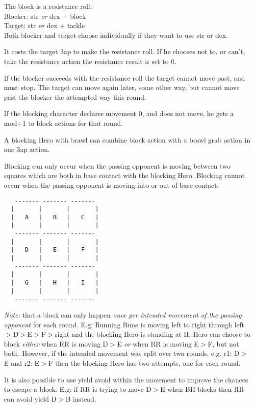 The block is a resistance roll: \\
Blocker: str \emph{or} dex + block \\
Target: str \emph{or} dex + tackle \\
Both blocker and target choose individually if they want to use str or dex.

It costs the target 3ap to make the resistance roll. If he chooses not to, or can't, take the resistance action the resistance result is set to 0.

If the blocker succeeds with the resistance roll the target cannot move past, and must stop. The target can move again later, some other way, but cannot move past the blocker the attempted way this round.

If the blocking character declares movement 0, and does not move, he gets a mod+1 to block actions for that round.

A blocking Hero with brawl can combine block action with a brawl grab action in one 3ap action.

Blocking can only occur when the passing opponent is moving between two squares which are both in base contact with the blocking Hero. Blocking cannot occur when the passing opponent is moving into or out of base contact.

\begin{samepage} \goodbreak
\scriptsize \begin{verbatim}
   ------- ------- -------
  |       |       |       |
  |   A   |   B   |   C   |
  |       |       |       |
   ------- ------- -------
  |       |       |       |
  |   D   |   E   |   F   |
  |       |       |       |
   ------- ------- -------
  |       |       |       |
  |   G   |   H   |   I   |
  |       |       |       |
   ------- ------- -------
\end{verbatim} \normalsize
\end{samepage}

\emph{Note:} that a block can only happen \emph{once per intended movement of the passing opponent} for each round. E.g: Running Rune is moving left to right through left$>$D$>$E$>$F$>$right and the blocking Hero is standing at H. Hero can choose to block \emph{either} when RR is moving D$>$E \emph{or} when RR is moving E$>$F, but not both. However, if the intended movement was split over two rounds, e.g. r1: D$>$E and r2: E$>$F then the blocking Hero has two attempts, one for each round.

It is also possible to use yield avoid within the movement to improve the chances to escape a block. E.g: if RR is trying to move D$>$E when BH blocks then RR can avoid yield D$>$B instead.

